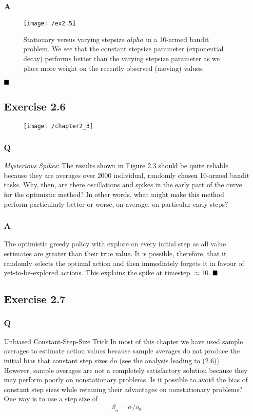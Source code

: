 \subsubsection*{A}
\ProgrammingExercise
\begin{figure}[h!]
	\centering
	\texttt{[image: /ex2.5]}
	\caption{Stationary versus varying stepsize \(alpha\) in a 10-armed bandit problem. We see that the constant stepsize parameter (exponential decay) performs better than the varying stepsize parameter as we place more weight on the recently observed (moving) values.}
	\label{fig:ex2.5}
\end{figure}
$
\hfill \blacksquare
$

\subsection{Exercise 2.6}
\begin{figure}[h!]
	\centering
	\texttt{[image: /chapter2\_3]}
	\caption{}
	\label{fig:chapter2_3}
\end{figure}

\subsubsection*{Q}
\textit{Mysterious Spikes}: The results shown in Figure 2.3 should be quite reliable because they are averages over 2000 individual, randomly chosen 10-armed bandit tasks. Why, then, are there oscillations and spikes in the early part of the curve for the optimistic
method? In other words, what might make this method perform particularly better or worse, on average, on particular early steps?

\subsubsection*{A}
The optimistic greedy policy with explore on every initial step as all value estimates are greater than their true value. It is possible, therefore, that it randomly selects the optimal action and then immediately forgets it in favour of yet-to-be-explored actions. This explains the spike at timestep \(\approx 10\).
$
\hfill \blacksquare
$

\subsection{Exercise 2.7}
\subsubsection*{Q}
Unbiased Constant-Step-Size Trick In most of this chapter we have used sample averages to estimate action values because sample averages do not produce the initial bias that constant step sizes do (see the analysis leading to (2.6)). However, sample averages are not a completely satisfactory solution because they may perform poorly on nonstationary problems. Is it possible to avoid the bias of constant step sizes while retaining their advantages on nonstationary problems? One way is to use a step size of
\begin{equation}
	\beta_n = \alpha / \bar{o_n}
\end{equation}

